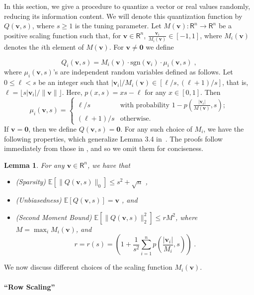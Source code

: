 \documentclass{article}
\newcommand{\R}{\mathsf{R}}
\newcommand{\sgn}[1]{\mbox{sgn}(#1)}
\renewcommand{\vec}[1]{\mathbf{#1}}
\def\E{\mathbb{E}}
\newtheorem{lemma}{Lemma}
\begin{document}
In this section, we give a procedure to quantize a vector or real values randomly, reducing its information content. We will denote this quantization function by $Q(\vec{v},s)$, where $s\geq 1$ is the tuning parameter. 
Let $M(\vec{v}): \R^n \rightarrow \R^n$ be a positive scaling function such that, for $\vec{v}\in \R^n$, $\frac{\vec{v}_i}{M_i(\vec{v})} \in [-1, 1]$, where $M_i(\vec{v})$ denotes the $i$th element of $M(\vec{v})$.
For $\vec{v} \neq \vec{0}$ we define

\begin{equation}
Q_i(\vec{v},s) = M_i(\vec{v}) \cdot \sgn{\vec{v}_i} \cdot \mu_i(\vec{v},s) \; , \label{equ:quant2}
\end{equation}
where $\mu_i(\vec{v},s)$'s are independent random variables defined as follows. 
Let $0 \leq \ell < s$ be an integer such that $|\vec{v}_i|/M_i(\vec{v}) \in [ \ell / s, (\ell + 1) / s ]$, that is, $\ell = \lfloor s |\vec{v}_i|/\| \vec{v} \| \rfloor$. 
Here, $p(x,s) = x s - \ell$ for any $x \in [0,1]$.
Then 
\[
\mu_i(\vec{v},s) = \left\{ \begin{array}{ll}
         \ell / s & \mbox{with probability $1 - p\left(\frac{|\vec{v}_i|}{M(\vec{v})},s\right)$};\\
         (\ell + 1) / s & \mbox{otherwise}. \end{array} \right.
\]
If $\vec{v} = \vec{0}$, then we define $Q(\vec{v},s) = \vec{0}$.
For any such choice of $M_i$, we have the following properties, which generalize Lemma 3.4 in~\cite{Alistarh:2016:ArXiv}.
The proofs follow immediately from those in \cite{Alistarh:2016:ArXiv}, and so we omit them for conciseness.
\begin{lemma}
\label{lem:quant-facts}
 For any $\vec{v} \in \R^n$, we have that 
 \begin{itemize} 
 \item (Sparsity) $\E[ \|Q(\vec{v}, s)\|_0]\leq
 s^2 +\sqrt{n}$ , 
 \item (Unbiasedness) $\E [Q (\vec{v},s)] = \vec{v}$ , and
 \item (Second Moment Bound) 
$\E [\| Q (\vec{v},s) \|_2^2] \leq r M^2$, where $M = \max_i M_i (\vec{v})$, and 
\[
r = r(s) = \left( 1 + \frac{1}{s^2} \sum_{i = 1}^n p\left( \frac{|\vec{v}_i|}{M_i },s \right) \right) \; .
\]
 \end{itemize}
\end{lemma}


We now discuss different choices of the scaling function $M_i(\vec{v})$.

\paragraph*{``Row Scaling''}
\end{document}
